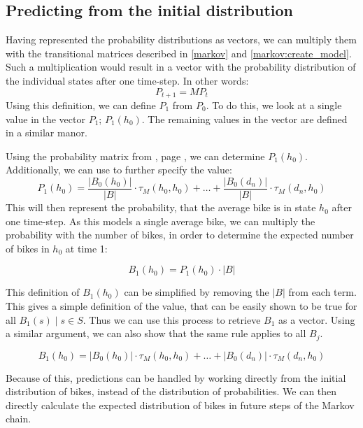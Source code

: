 \subsection{Predicting from the initial distribution}
Having represented the probability distributions as vectors, we can multiply them with the transitional matrices described in \cref{markov} and \cref{markov:create_model}.
Such a multiplication would result in a vector with the probability distribution of the individual states after one time-step.
In other words:
\begin{equation}
P_{t+1} = M  P_t
\end{equation}
Using this definition, we can define $P_1$ from $P_0$.
To do this, we look at a single value in the vector $P_1$; $P_1(h_0)$.
The remaining values in the vector are defined in a similar manor.

Using the probability matrix from , page \pageref{markov:matrix-ordered}, we can determine $P_1(h_0)$.
Additionally, we can use  to further specify the value:
$$
P_1(h_0) = 
\frac{\lvert B_0(h_0) \rvert}{\lvert B \rvert}
\cdot \tau_M(h_0, h_0) + \dots +
\frac{\lvert B_0(d_n) \rvert}{\lvert B \rvert}
\cdot \tau_M(d_n, h_0)
$$
This will then represent the probability, that the average bike is in state $h_0$ after one time-step.
As this models a single average bike, we can multiply the probability with the number of bikes, in order to determine the expected number of bikes in $h_0$ at time 1:

$$B_1(h_0) = P_1(h_0) \cdot |B|$$

This definition of $B_1(h_0)$ can be simplified by removing the $|B|$ from each term.
This gives a simple definition of the value, that can be easily shown to be true for all $B_1(s) \mid s \in S$.
Thus we can use this process to retrieve $B_1$ as a vector.
Using a similar argument, we can also show that the same rule applies to all $B_j$.

$$
B_1(h_0) = 
\lvert B_0(h_0) \rvert
\cdot \tau_M(h_0, h_0) + \dots +
\lvert B_0(d_n) \rvert
\cdot \tau_M(d_n, h_0)
$$

Because of this, predictions can be handled by working directly from the initial distribution of bikes, instead of the distribution of probabilities.
We can then directly calculate the expected distribution of bikes in future steps of the Markov chain.

